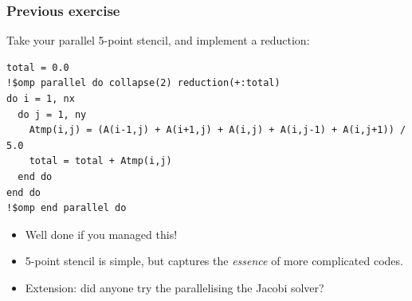 \documentclass{beamer}
\begin{document}
\begin{frame}[fragile]
\frametitle{Previous exercise}

Take your parallel 5-point stencil, and implement a reduction:
\begin{verbatim}
total = 0.0
!$omp parallel do collapse(2) reduction(+:total)
do i = 1, nx
  do j = 1, ny
    Atmp(i,j) = (A(i-1,j) + A(i+1,j) + A(i,j) + A(i,j-1) + A(i,j+1)) / 5.0
    total = total + Atmp(i,j)
  end do
end do
!$omp end parallel do
\end{verbatim}

\begin{itemize}
  \item Well done if you managed this!
  \item 5-point stencil is simple, but captures the \emph{essence} of more complicated codes.
  \item Extension: did anyone try the parallelising the Jacobi solver?
\end{itemize}

\end{frame}

\end{document}
